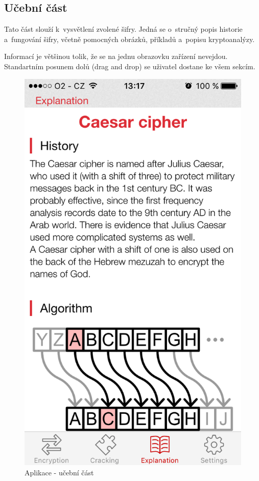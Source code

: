 \documentclass[glossaries, index]{kidiplom}
\begin{document}
\subsection{Učební část}
\label{app-explanation-section}
Tato část slouží k~vysvětlení zvolené šifry. Jedná se o~stručný popis historie a~fungování šifry, včetně pomocných obrázků, příkladů a~popisu kryptoanalýzy.

Informací je většinou tolik, že se na jednu obrazovku zařízení nevejdou. Standartním posunem dolů (drag and drop) se uživatel dostane ke všem sekcím.

\begin{figure}[htbp]
\centering
\includegraphics[scale=0.32]{graphics/app/explanation.png}
\caption{Aplikace - učební část}
\label{app-explanation}
\end{figure}
\end{document}
